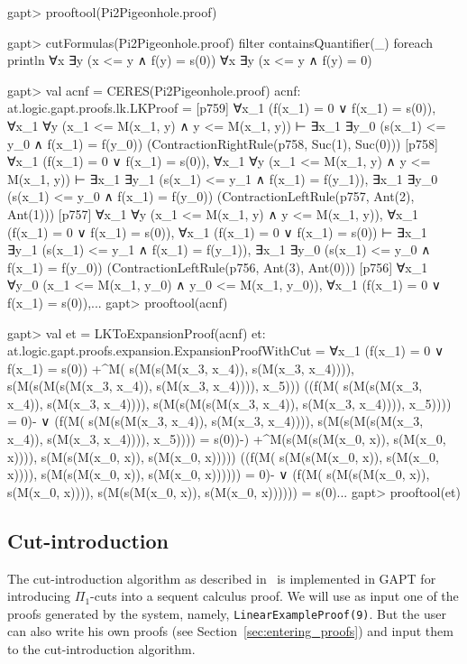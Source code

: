 \documentclass[a4paper,11pt]{article}
\begin{document}
\begin{clilisting}
gapt> prooftool(Pi2Pigeonhole.proof)

gapt> cutFormulas(Pi2Pigeonhole.proof) filter {containsQuantifier(_)} foreach println
∀x ∃y (x <= y ∧ f(y) = s(0))
∀x ∃y (x <= y ∧ f(y) = 0)

gapt> val acnf = CERES(Pi2Pigeonhole.proof)
acnf: at.logic.gapt.proofs.lk.LKProof =
[p759] ∀x_1 (f(x_1) = 0 ∨ f(x_1) = s(0)),
∀x_1 ∀y (x_1 <= M(x_1, y) ∧ y <= M(x_1, y))
⊢
∃x_1 ∃y_0 (s(x_1) <= y_0 ∧ f(x_1) = f(y_0))    (ContractionRightRule(p758, Suc(1), Suc(0)))
[p758] ∀x_1 (f(x_1) = 0 ∨ f(x_1) = s(0)),
∀x_1 ∀y (x_1 <= M(x_1, y) ∧ y <= M(x_1, y))
⊢
∃x_1 ∃y_1 (s(x_1) <= y_1 ∧ f(x_1) = f(y_1)),
∃x_1 ∃y_0 (s(x_1) <= y_0 ∧ f(x_1) = f(y_0))    (ContractionLeftRule(p757, Ant(2), Ant(1)))
[p757] ∀x_1 ∀y (x_1 <= M(x_1, y) ∧ y <= M(x_1, y)),
∀x_1 (f(x_1) = 0 ∨ f(x_1) = s(0)),
∀x_1 (f(x_1) = 0 ∨ f(x_1) = s(0))
⊢
∃x_1 ∃y_1 (s(x_1) <= y_1 ∧ f(x_1) = f(y_1)),
∃x_1 ∃y_0 (s(x_1) <= y_0 ∧ f(x_1) = f(y_0))    (ContractionLeftRule(p756, Ant(3), Ant(0)))
[p756] ∀x_1 ∀y_0 (x_1 <= M(x_1, y_0) ∧ y_0 <= M(x_1, y_0)),
∀x_1 (f(x_1) = 0 ∨ f(x_1) = s(0)),...
gapt> prooftool(acnf)

gapt> val et = LKToExpansionProof(acnf)
et: at.logic.gapt.proofs.expansion.ExpansionProofWithCut =
∀x_1 (f(x_1) = 0 ∨ f(x_1) = s(0))
  +^{M(
      s(M(s(M(x_3, x_4)), s(M(x_3, x_4)))),
      s(M(s(M(s(M(x_3, x_4)), s(M(x_3, x_4)))), x_5)))}
    ((f(M(
            s(M(s(M(x_3, x_4)), s(M(x_3, x_4)))),
            s(M(s(M(s(M(x_3, x_4)), s(M(x_3, x_4)))), x_5)))) =
        0)- ∨
      (f(M(
            s(M(s(M(x_3, x_4)), s(M(x_3, x_4)))),
            s(M(s(M(s(M(x_3, x_4)), s(M(x_3, x_4)))), x_5)))) =
        s(0))-)
  +^{M(s(M(s(M(x_0, x)), s(M(x_0, x)))), s(M(s(M(x_0, x)), s(M(x_0, x)))))}
    ((f(M(
            s(M(s(M(x_0, x)), s(M(x_0, x)))),
            s(M(s(M(x_0, x)), s(M(x_0, x)))))) =
        0)- ∨
      (f(M(
            s(M(s(M(x_0, x)), s(M(x_0, x)))),
            s(M(s(M(x_0, x)), s(M(x_0, x)))))) =
        s(0)...
gapt> prooftool(et)

\end{clilisting}

\subsection{Cut-introduction}\label{sec.cut-introduction}

The cut-introduction algorithm as described in~\cite{Hetzl2012,Hetzl14Algorithmic,Hetzl14Introducing} is
implemented in GAPT for introducing $\Pi_1$-cuts into a sequent calculus
proof. We will use as input one of the proofs generated by
the system, namely, \texttt{LinearExampleProof(9)}. But the user can also
write his own proofs (see Section~\ref{sec:entering_proofs})
and input them to the cut-introduction algorithm.
\end{document}
